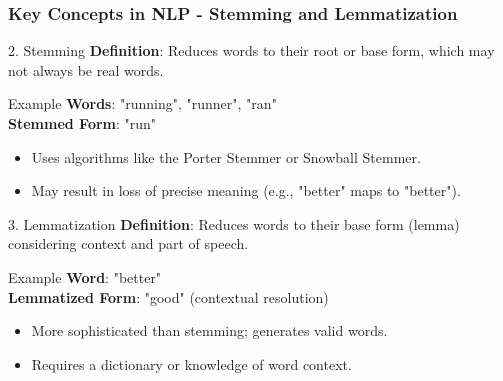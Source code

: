 \documentclass[aspectratio=169]{beamer}
\begin{document}
\begin{frame}[fragile]
    \frametitle{Key Concepts in NLP - Stemming and Lemmatization}
    \begin{block}{2. Stemming}
        \textbf{Definition}: Reduces words to their root or base form, which may not always be real words.
    \end{block}

    \begin{exampleblock}{Example}
        \textbf{Words}: "running", "runner", "ran" \\
        \textbf{Stemmed Form}: "run"
    \end{exampleblock}

    \begin{itemize}
        \item Uses algorithms like the Porter Stemmer or Snowball Stemmer.
        \item May result in loss of precise meaning (e.g., "better" maps to "better").
    \end{itemize}

    \begin{block}{3. Lemmatization}
        \textbf{Definition}: Reduces words to their base form (lemma) considering context and part of speech.
    \end{block}

    \begin{exampleblock}{Example}
        \textbf{Word}: "better" \\
        \textbf{Lemmatized Form}: "good" (contextual resolution)
    \end{exampleblock}

    \begin{itemize}
        \item More sophisticated than stemming; generates valid words.
        \item Requires a dictionary or knowledge of word context.
    \end{itemize}
\end{frame}
\end{document}
